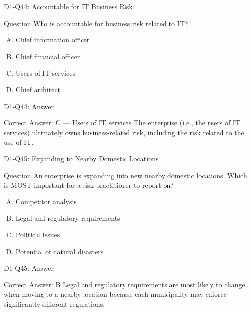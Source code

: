 \documentclass{beamer}
\begin{document}
	\begin{frame}{D1-Q44: Accountable for IT Business Risk}
		\begin{block}{Question}
			Who is accountable for business risk related to IT?
		\end{block}
		\begin{enumerate}[(A)]
			\item Chief information officer
			\item Chief financial officer
			\item Users of IT services
			\item Chief architect
		\end{enumerate}
	\end{frame}
	\begin{frame}{D1-Q44: Answer}
		\begin{block}{Correct Answer: C --- Users of IT services}
			The enterprise (i.e., the users of IT services) ultimately owns business-related risk, including the risk related to the use of IT.
		\end{block}
	\end{frame}
	
	\begin{frame}{D1-Q45: Expanding to Nearby Domestic Locations}
		\begin{block}{Question}
			An enterprise is expanding into new nearby domestic locations. Which is MOST important for a risk practitioner to report on?
		\end{block}
		\begin{enumerate}[(A)]
			\item Competitor analysis
			\item Legal and regulatory requirements
			\item Political issues
			\item Potential of natural disasters
		\end{enumerate}
	\end{frame}
	\begin{frame}{D1-Q45: Answer}
		\begin{block}{Correct Answer: B}
			Legal and regulatory requirements are most likely to change when moving to a nearby location because each municipality may enforce significantly different regulations.
		\end{block}
	\end{frame}
	
\end{document}
